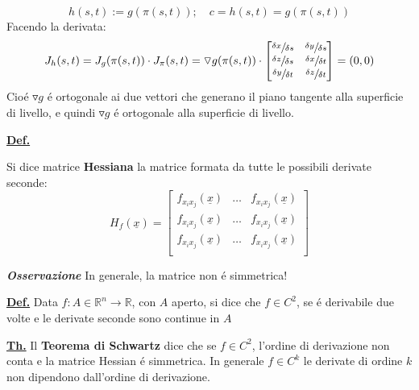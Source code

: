 \documentclass[a4paper,10pt]{article} %
\renewcommand{\b}[1]{%
    {\textbf{#1}}}
\renewcommand{\v}[1]{%
    {\underline{#1}}}
\newcommand{\ldef}[1]{%
    {\smallbreak\par\tiny\textbf{\underline{Def.}} {#1} \smallbreak}}
\newcommand{\ltheorem}[1]{%
    {\smallbreak\par\tiny\textbf{\underline{Th.}} {#1} \smallbreak\par}}
\newcommand{\loss}[1]{%
    {\smallbreak\par\tiny\emph{\textbf{Osservazione}} {#1} \par}}
\begin{document}
\begin{multicols}{6}
{{    \[
        h(s, t):= g(\pi(s, t)); \quad c = h(s,t) = g(\pi(s,t))
    \]
    Facendo la derivata:
    \[
        J_h(s,t) = J_g(\pi(s,t)) \cdot J_\pi(s,t) =
        \triangledown g(\pi(s,t)) \cdot
        \begin{bmatrix}
            \sfrac{\delta x}{\delta s} &
            \sfrac{\delta y}{\delta s} \\
            \sfrac{\delta z}{\delta s} & 
            \sfrac{\delta x}{\delta t} \\
            \sfrac{\delta y}{\delta t} &
            \sfrac{\delta z}{\delta t} 
        \end{bmatrix} = (0, 0)
    \]
    Cioé $ \triangledown g$ é ortogonale ai due vettori che generano
    il piano tangente alla superficie di livello, e quindi
    $ \triangledown g$ é ortogonale alla superficie di livello.
    }
}


\ldef{
    Si dice matrice \b{Hessiana} la matrice formata da tutte le possibili
    derivate seconde:
    \[
        H_f(\v{x}) = 
        \begin{bmatrix}
            f_{x_ix_j}(\v{x}) & \dots & f_{x_ix_j}(\v{x}) \\
            f_{x_ix_j}(\v{x}) & \dots & f_{x_ix_j}(\v{x}) \\
            f_{x_ix_j}(\v{x}) & \dots & f_{x_ix_j}(\v{x}) \\
        \end{bmatrix}
    \]
    \loss{
        In generale, la matrice non é simmetrica!
    }
}

\ldef{
    Data $f:A\in\mathbb{R}^n\rightarrow\mathbb{R}$, con $A$ aperto,
    si dice che $ f \in C^2$, se \'{e} derivabile due volte e le derivate
    seconde sono continue in $A$
}

\ltheorem{ 
    Il \b{Teorema di Schwartz} dice che se $f \in C^2$, l'ordine di 
    derivazione non conta e la matrice Hessian é simmetrica. In generale
    $ f \in C^k $ le derivate di ordine $k$ non dipendono dall'ordine
    di derivazione.
}


\end{multicols}
\end{document}
